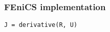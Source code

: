 \begin{frame}[fragile]
  \frametitle{FEniCS implementation}

  \vspace{0.5cm}

  \begin{center}
    \tt J = derivative(R, U)
  \end{center}

\end{frame}
